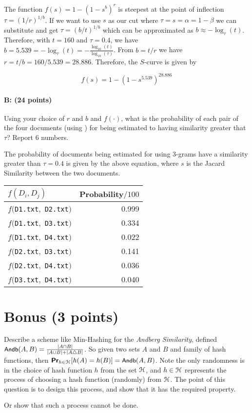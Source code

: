 \documentclass[11pt]{article}
\newcommand{\Andb}{\ensuremath{\textsf{\small Andb}}}
\begin{document}
The function $f(s) = 1 - \left( 1 - s^{b}\right)^{r}$ is steepest at the point of inflection $\tau = (1/r)^{1/b}$. If we want to use $s$ as our cut where $\tau = s = \alpha = 1-\beta$ we can substitute and get $\tau = (b/t)^{1/b}$ which can be approximated as $b \approx -\log_{\tau}(t)$. Therefore, with $t = 160$ and $\tau = 0.4$, we have $b = 5.539 = -\log_{\tau}(t) = -\frac{\log_{10}(t)}{\log_{10}(\tau)}$. From $b = t/r$ we have $r = t/b = 160/5.539 = 28.886$. Therefore, the $S$-curve is given by

\[
    f(s) = 1 - \left( 1 - s^{5.539}\right)^{28.886}
\]

\paragraph{B: (24 points)}
Using your choice of $r$ and $b$ and $f(\cdot)$, what is the probability of each pair of the four documents (using \s{[G2]}) for being estimated to having similarity greater that $\tau$?  
Report $6$ numbers.  

The probability of documents being estimated for using 3-grams have a similarity greater than $\tau = 0.4$ is given by the above equation, where $s$ is the Jacard Similarity between the two documents.

\begin{table}[H]
\centering
\begin{tabular}{lr}
\hline\hline
$f(D_{i}, D_{j})$ & Probability$/100$\\
\hline
$f(${\tt D1.txt}$,$ {\tt D2.txt}$)$ & 0.999\\
$f(${\tt D1.txt}$,$ {\tt D3.txt}$)$ & 0.334\\
$f(${\tt D1.txt}$,$ {\tt D4.txt}$)$ & 0.022\\
$f(${\tt D2.txt}$,$ {\tt D3.txt}$)$ & 0.141\\
$f(${\tt D2.txt}$,$ {\tt D4.txt}$)$ & 0.036\\
$f(${\tt D3.txt}$,$ {\tt D4.txt}$)$ & 0.040\\
\hline
\end{tabular}
\end{table}




\section{Bonus (3 points)}

Describe a scheme like Min-Hashing for the \emph{Andberg Similarity}, defined $\Andb(A,B) = \frac{|A \cap B|}{|A \cup B| + |A \triangle B|}$.  So given two sets $A$ and $B$ and family of hash functions, then $\Pr_{h \in \Eu{H}}[h(A) = h(B)] = \Andb(A,B)$.  Note the only randomness is in the choice of hash function $h$ from the set $\EuScript{H}$, and $h \in \EuScript{H}$ represents the process of choosing a hash function (randomly) from $\EuScript{H}$.  The point of this question is to design this process, and show that it has the required property.  

Or show that such a process cannot be done.  
\end{document}
